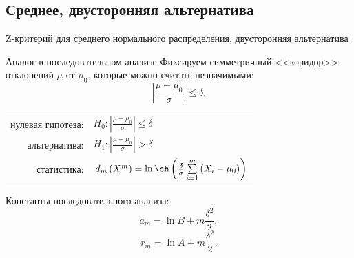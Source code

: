 \documentclass[9pt,pdf,utf8,hyperref={unicode},aspectratio=169]{beamer}
\renewcommand{\leq}{\leqslant}
\begin{document}
\subsection{Среднее, двусторонняя альтернатива}
\begin{frame}{Z-критерий для среднего нормального распределения, двусторонняя альтернатива}

\end{frame}

\begin{frame}{Аналог в последовательном анализе}
    Фиксируем симметричный <<коридор>> отклонений $\mu$ от $\mu_0$, которые можно считать незначимыми:
    $$\left|\frac{\mu-\mu_0}{\sigma}\right|\leq\delta.$$

    \bigskip

    \begin{center}
        \begin{tabular}{rl}
            нулевая гипотеза:               & $H_0\colon \left|\frac{\mu-\mu_0}{\sigma}\right|\leq\delta$ \\
            альтернатива:                   & $H_1\colon \left|\frac{\mu-\mu_0}{\sigma}\right|>\delta$ \\
            статистика:                     & $d_m\left(X^{m}\right) = \ln \ch \left(\frac{\delta}{\sigma}\sum\limits_{i=1}^m \left(X_{i}-\mu_0\right)\right)$ \\
        \end{tabular}
    \end{center}

    \bigskip

    Константы последовательного анализа:
    $$a_m = \ln B +m\frac{\delta^2}{2},$$
    $$r_m = \ln A +m\frac{\delta^2}{2}.$$
\end{frame}
\end{document}
